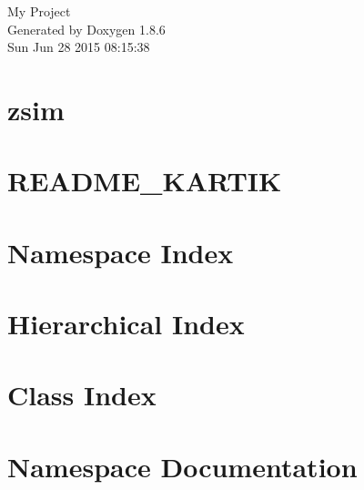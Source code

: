 \documentclass[twoside]{book}
\newcommand{\clearemptydoublepage}{%
  \newpage{\pagestyle{empty}\cleardoublepage}%
}
\begin{document}
\hypersetup{pageanchor=false}
\begin{titlepage}
\vspace*{7cm}
\begin{center}%
{\Large My Project }\\
\vspace*{1cm}
{\large Generated by Doxygen 1.8.6}\\
\vspace*{0.5cm}
{\small Sun Jun 28 2015 08:15:38}\\
\end{center}
\end{titlepage}
\clearemptydoublepage
\tableofcontents
\clearemptydoublepage
{}
\hypersetup{pageanchor=true}

\chapter{zsim}
\label{md_README}
\hypertarget{md_README}{}

\chapter{R\-E\-A\-D\-M\-E\-\_\-\-K\-A\-R\-T\-I\-K}
\label{md_README_KARTIK}
\hypertarget{md_README_KARTIK}{}

\chapter{Namespace Index}

\chapter{Hierarchical Index}

\chapter{Class Index}

\chapter{Namespace Documentation}


\end{document}
